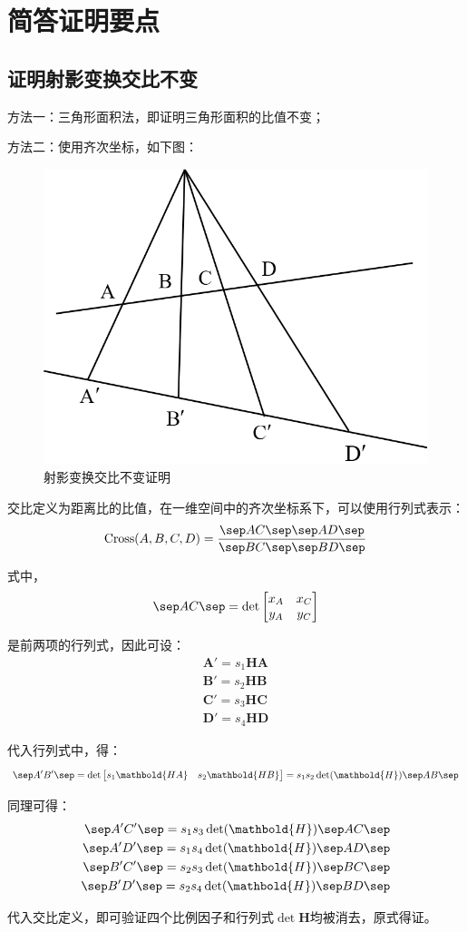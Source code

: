 \documentclass[11pt]{article}
\begin{document}
\section{简答证明要点}
\subsection{证明射影变换交比不变}
方法一：三角形面积法，即证明三角形面积的比值不变；\par
方法二：使用齐次坐标，如下图：
\begin{figure}[H]
  \centering
  \includegraphics[width=0.5\linewidth]{证明题1.png}
  \caption{射影变换交比不变证明}
\end{figure}\par
交比定义为距离比的比值，在一维空间中的齐次坐标系下，可以使用行列式表示：
$$
  \mathrm{Cross}(A,B,C,D)=\frac{
    \sep AC\sep \sep AD\sep
  }{\sep BC\sep \sep BD\sep }
$$\par
式中，
$$
  \sep AC\sep =\det\begin{bmatrix}
    x_A & x_C \\
    y_A & y_C \\
  \end{bmatrix}
$$\par
是前两项的行列式，因此可设：
$$
  \begin{aligned}
    \mathbold{A}'=s_1\mathbold{HA} \\
    \mathbold{B}'=s_2\mathbold{HB} \\
    \mathbold{C}'=s_3\mathbold{HC} \\
    \mathbold{D}'=s_4\mathbold{HD}
  \end{aligned}
$$\par
代入行列式中，得：
$$
  \begin{aligned}
    \sep A'B'\sep =\det\begin{bmatrix}
                         s_1\mathbold{HA} & s_2\mathbold{HB}
                       \end{bmatrix}=s_1s_2\det(\mathbold{H})\sep AB\sep
  \end{aligned}
$$\par
同理可得：
$$
  \begin{aligned}
    \sep A'C'\sep =s_1s_3\det(\mathbold{H})\sep AC\sep \\
    \sep A'D'\sep =s_1s_4\det(\mathbold{H})\sep AD\sep \\
    \sep B'C'\sep =s_2s_3\det(\mathbold{H})\sep BC\sep \\
    \sep B'D'\sep =s_2s_4\det(\mathbold{H})\sep BD\sep \\
  \end{aligned}
$$\par
代入交比定义，即可验证四个比例因子和行列式$\det\mathbold{H}$均被消去，原式得证。
\end{document}
